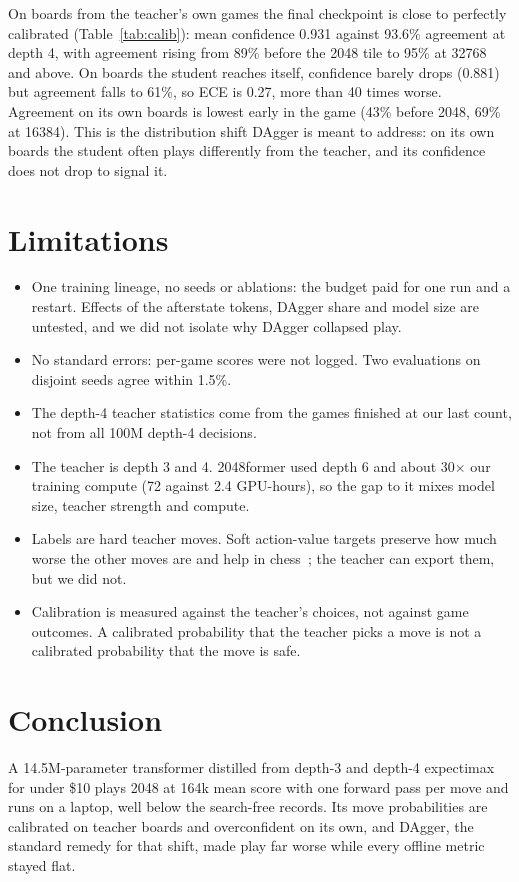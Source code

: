 \documentclass{article}
\begin{document}
On boards from the teacher's own games the final checkpoint is close to perfectly calibrated (Table~\ref{tab:calib}): mean confidence 0.931 against 93.6\% agreement at depth 4, with agreement rising from 89\% before the 2048 tile to 95\% at 32768 and above.
On boards the student reaches itself, confidence barely drops (0.881) but agreement falls to 61\%, so ECE is 0.27, more than 40 times worse.
Agreement on its own boards is lowest early in the game (43\% before 2048, 69\% at 16384).
This is the distribution shift DAgger is meant to address: on its own boards the student often plays differently from the teacher, and its confidence does not drop to signal it.

\section{Limitations}
\begin{itemize}[leftmargin=*,nosep]
  \item One training lineage, no seeds or ablations: the budget paid for one run and a restart. Effects of the afterstate tokens, DAgger share and model size are untested, and we did not isolate why DAgger collapsed play.
  \item No standard errors: per-game scores were not logged. Two evaluations on disjoint seeds agree within 1.5\%.
  \item The depth-4 teacher statistics come from the games finished at our last count, not from all 100M depth-4 decisions.
  \item The teacher is depth 3 and 4. 2048former used depth 6 and about 30$\times$ our training compute (72 against 2.4 GPU-hours), so the gap to it mixes model size, teacher strength and compute.
  \item Labels are hard teacher moves. Soft action-value targets preserve how much worse the other moves are and help in chess~\citep{ruoss2024amortized}; the teacher can export them, but we did not.
  \item Calibration is measured against the teacher's choices, not against game outcomes. A calibrated probability that the teacher picks a move is not a calibrated probability that the move is safe.
\end{itemize}

\section{Conclusion}
A 14.5M-parameter transformer distilled from depth-3 and depth-4 expectimax for under \$10 plays 2048 at 164k mean score with one forward pass per move and runs on a laptop, well below the search-free records.
Its move probabilities are calibrated on teacher boards and overconfident on its own, and DAgger, the standard remedy for that shift, made play far worse while every offline metric stayed flat.
\end{document}
